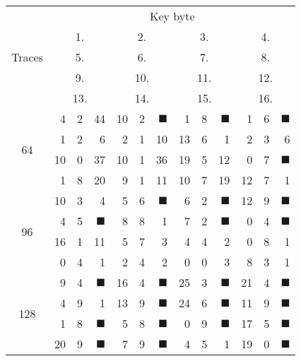 \begin{tabular}{| c | r@{.} l@{\quad}r | r@{.} l@{\quad}r | r@{.} l@{\quad}r | r@{.} l@{\quad}r |}
	\hline
	\multirow{5}{*}{Traces} & \multicolumn{12}{c|}{Key byte} \\
	\cline{2-13}
	~  &  \multicolumn{3}{c|}{1.} &  \multicolumn{3}{c|}{2.} &  \multicolumn{3}{c|}{3.} &  \multicolumn{3}{c|}{4.} \\
	\cline{2-13}
	~  &  \multicolumn{3}{c|}{5.} &  \multicolumn{3}{c|}{6.} &  \multicolumn{3}{c|}{7.} &  \multicolumn{3}{c|}{8.} \\
	\cline{2-13}
	~  &  \multicolumn{3}{c|}{ 9.} & \multicolumn{3}{c|}{10.} & \multicolumn{3}{c|}{11.} & \multicolumn{3}{c|}{12.} \\
	\cline{2-13}
	~  &  \multicolumn{3}{c|}{13.} & \multicolumn{3}{c|}{14.} & \multicolumn{3}{c|}{15.} & \multicolumn{3}{c|}{16.} \\
	\hline
	\hline
	\multirow{4}{*}{64} & 4&2&44&10&2&{$\blacksquare$}&1&8&{\weak$\blacksquare$}&1&6&{\weak$\blacksquare$} \\
	\cline{2-13}
	~ & 1&2&6&2&1&10&13&6&1&2&3&6 \\
	\cline{2-13}
	~ & 10&0&37&10&1&36&19&5&12&0&7&{\weak$\blacksquare$} \\
	\cline{2-13}
	~ & 1&8&20&9&1&11&10&7&19&12&7&1 \\
	\hline
	\hline
	\multirow{4}{*}{96}&10&3&4&5&6&{\weak$\blacksquare$}&6&2&{\weak$\blacksquare$}&12&9&{$\blacksquare$} \\
	\cline{2-13}
	~ & 4&5&{\weak$\blacksquare$}&8&8&1&7&2&{\weak$\blacksquare$}&0&4&{\weak$\blacksquare$} \\
	\cline{2-13}
	~ & 16&1&11&5&7&3&4&4&2&0&8&1 \\
	\cline{2-13}
	~ & 0&4&1&2&4&2&0&0&3&8&3&1 \\
	\hline
	\hline
	\multirow{4}{*}{128}&9&4&{\weak$\blacksquare$}&16&4&{$\blacksquare$}&25&3&{$\blacksquare$}&21&4&{$\blacksquare$} \\
	\cline{2-13}
	~ & 4&9&1&13&9&{$\blacksquare$}&24&6&{$\blacksquare$}&11&9&{$\blacksquare$} \\
	\cline{2-13}
	~ & 1&8&{\weak$\blacksquare$}&5&8&{\weak$\blacksquare$}&0&9&{\weak$\blacksquare$}&17&5&{$\blacksquare$} \\
	\cline{2-13}
	~ & 20&9&{$\blacksquare$}&7&9&{\weak$\blacksquare$}&4&5&1&19&0&{$\blacksquare$}	 \\
	\hline
\end{tabular}
